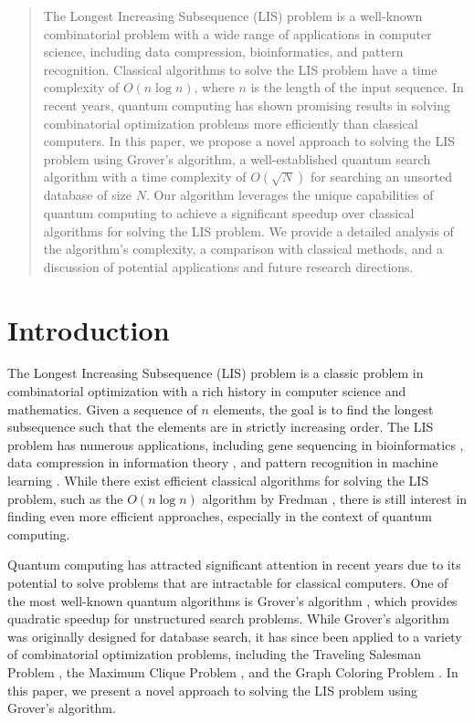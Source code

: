 \begin{abstract}
The Longest Increasing Subsequence (LIS) problem is a well-known combinatorial problem with a wide range of applications in computer science, including data compression, bioinformatics, and pattern recognition. Classical algorithms to solve the LIS problem have a time complexity of $O(n \log n)$, where $n$ is the length of the input sequence. In recent years, quantum computing has shown promising results in solving combinatorial optimization problems more efficiently than classical computers. In this paper, we propose a novel approach to solving the LIS problem using Grover's algorithm, a well-established quantum search algorithm with a time complexity of $O(\sqrt{N})$ for searching an unsorted database of size $N$. Our algorithm leverages the unique capabilities of quantum computing to achieve a significant speedup over classical algorithms for solving the LIS problem. We provide a detailed analysis of the algorithm's complexity, a comparison with classical methods, and a discussion of potential applications and future research directions.

\end{abstract}

\section{Introduction}

The Longest Increasing Subsequence (LIS) problem is a classic problem in combinatorial optimization with a rich history in computer science and mathematics. Given a sequence of $n$ elements, the goal is to find the longest subsequence such that the elements are in strictly increasing order. The LIS problem has numerous applications, including gene sequencing in bioinformatics \cite{bioinformatics}, data compression in information theory \cite{data_compression}, and pattern recognition in machine learning \cite{pattern_recognition}. While there exist efficient classical algorithms for solving the LIS problem, such as the $O(n \log n)$ algorithm by Fredman \cite{fredman}, there is still interest in finding even more efficient approaches, especially in the context of quantum computing.

Quantum computing has attracted significant attention in recent years due to its potential to solve problems that are intractable for classical computers. One of the most well-known quantum algorithms is Grover's algorithm \cite{grover}, which provides quadratic speedup for unstructured search problems. While Grover's algorithm was originally designed for database search, it has since been applied to a variety of combinatorial optimization problems, including the Traveling Salesman Problem \cite{TSP}, the Maximum Clique Problem \cite{max_clique}, and the Graph Coloring Problem \cite{graph_coloring}. In this paper, we present a novel approach to solving the LIS problem using Grover's algorithm.

